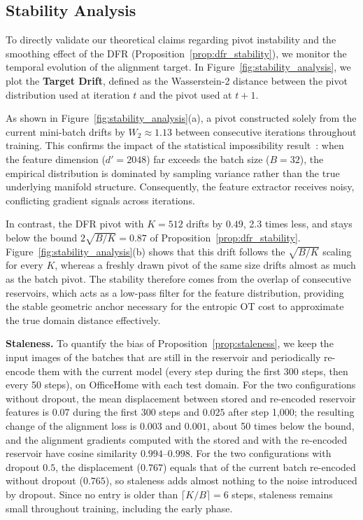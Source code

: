 \subsection{Stability Analysis}
\label{sec:stability_analysis}

To directly validate our theoretical claims regarding pivot instability and the smoothing effect of the DFR (Proposition~\ref{prop:dfr_stability}), we monitor the temporal evolution of the alignment target. In Figure~\ref{fig:stability_analysis}, we plot the \textbf{Target Drift}, defined as the Wasserstein-2 distance between the pivot distribution used at iteration $t$ and the pivot used at $t+1$.

As shown in Figure~\ref{fig:stability_analysis}(a), a pivot constructed solely from the current mini-batch drifts by $W_2\approx1.13$ between consecutive iterations throughout training. This confirms the impact of the statistical impossibility result~\citep{dong2025distribution}: when the feature dimension ($d'=2048$) far exceeds the batch size ($B=32$), the empirical distribution is dominated by sampling variance rather than the true underlying manifold structure. Consequently, the feature extractor receives noisy, conflicting gradient signals across iterations.

In contrast, the DFR pivot with $K=512$ drifts by $0.49$, 2.3 times less, and stays below the bound $2\sqrt{B/K}=0.87$ of Proposition~\ref{prop:dfr_stability}. Figure~\ref{fig:stability_analysis}(b) shows that this drift follows the $\sqrt{B/K}$ scaling for every $K$, whereas a freshly drawn pivot of the same size drifts almost as much as the batch pivot. The stability therefore comes from the overlap of consecutive reservoirs, which acts as a low-pass filter for the feature distribution, providing the stable geometric anchor necessary for the entropic OT cost to approximate the true domain distance effectively.

\textbf{Staleness.} To quantify the bias of Proposition~\ref{prop:staleness}, we keep the input images of the batches that are still in the reservoir and periodically re-encode them with the current model (every step during the first 300 steps, then every 50 steps), on OfficeHome with each test domain. For the two configurations without dropout, the mean displacement between stored and re-encoded reservoir features is $0.07$ during the first 300 steps and $0.025$ after step 1,000; the resulting change of the alignment loss is $0.003$ and $0.001$, about 50 times below the bound, and the alignment gradients computed with the stored and with the re-encoded reservoir have cosine similarity $0.994$--$0.998$. For the two configurations with dropout $0.5$, the displacement ($0.767$) equals that of the current batch re-encoded without dropout ($0.765$), so staleness adds almost nothing to the noise introduced by dropout. Since no entry is older than $\lceil K/B\rceil=6$ steps, staleness remains small throughout training, including the early phase.



